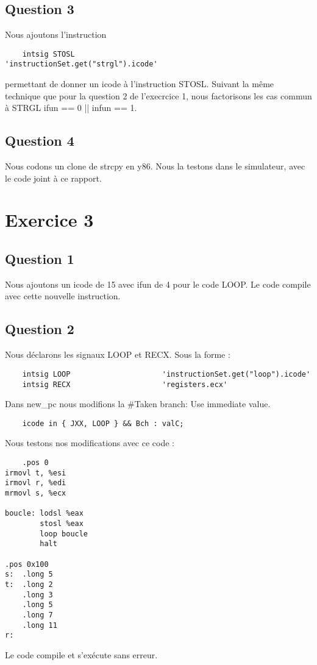 \documentclass[a4paper,10pt]{article}
\begin{document}
\subsection{Question 3}
Nous ajoutons l'instruction
\begin{verbatim}
    intsig STOSL                     'instructionSet.get("strgl").icode'
\end{verbatim}
permettant de donner un icode à l'instruction STOSL. Suivant la même technique que pour la question 2 de l'execrcice 1, nous factorisons les cas commun à STRGL ifun == 0 || infun == 1.

\subsection{Question 4}
Nous codons un clone de strcpy en y86. Nous la testons dans le simulateur, avec le code joint à ce rapport.

\section{Exercice 3}
\subsection{Question 1}
Nous ajoutons un icode de 15 avec ifun de 4 pour le code LOOP. Le code compile avec cette nouvelle instruction.

\subsection{Question 2}
Nous déclarons les signaux LOOP et RECX. Sous la forme :
\begin{verbatim}
    intsig LOOP                     'instructionSet.get("loop").icode'
    intsig RECX                     'registers.ecx'
\end{verbatim}


Dans new\_pc nous modifions la \#Taken branch: Use immediate value.

\begin{verbatim}
    icode in { JXX, LOOP } && Bch : valC;
\end{verbatim}

Nous testons nos modifications avec ce code :

\begin{verbatim}
    .pos 0
irmovl t, %esi
irmovl r, %edi
mrmovl s, %ecx

boucle: lodsl %eax
        stosl %eax
        loop boucle
        halt

.pos 0x100
s:  .long 5
t:  .long 2
    .long 3
    .long 5
    .long 7
    .long 11
r:

\end{verbatim}
Le code compile et s'exécute sans erreur.
\end{document}

